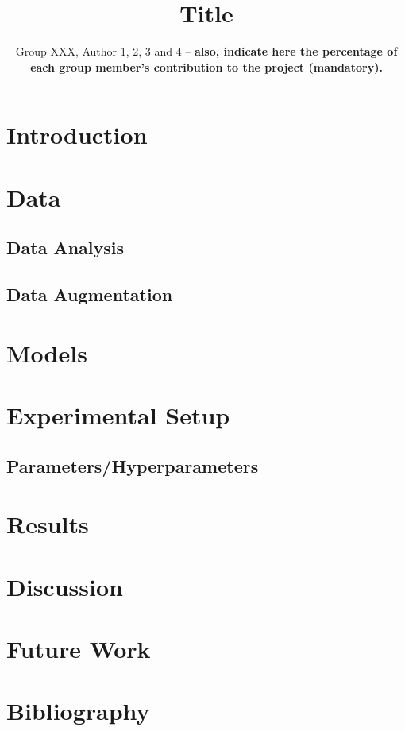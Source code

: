 \documentclass[twocolumn,10pt]{article}
\title{Title}
\author{Group XXX, Author 1, 2, 3 and 4 -- \textbf{also, indicate here the percentage of each group member’s contribution to the project (mandatory).}}
\begin{document}
\maketitle

\section{Introduction}

\section{Data}

\subsection{Data Analysis}

\subsection{Data Augmentation}

\section{Models}
 
\section{Experimental Setup}
 
\subsection{Parameters/Hyperparameters}

\section{Results}

\section{Discussion} 

\section{Future Work}

\section*{Bibliography}
\end{document}
